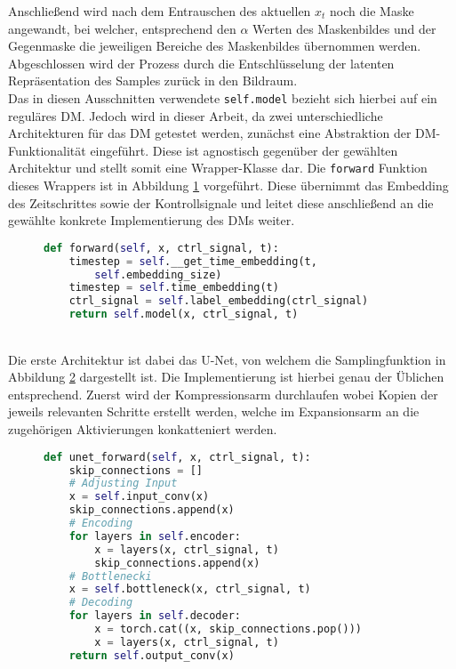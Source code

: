 Anschließend wird nach dem Entrauschen des aktuellen $x_t$ noch die Maske angewandt, bei welcher, entsprechend den $\alpha$ Werten des Maskenbildes und der Gegenmaske die jeweiligen Bereiche des Maskenbildes übernommen werden. \\
Abgeschlossen wird der Prozess durch die Entschlüsselung der latenten Repräsentation des Samples zurück in den Bildraum. \\
Das in diesen Ausschnitten verwendete \texttt{self.model} bezieht sich hierbei auf ein reguläres \ac{DM}. Jedoch wird in dieser Arbeit, da zwei unterschiedliche Architekturen für das DM getestet werden, zunächst eine Abstraktion der DM-Funktionalität eingeführt. Diese ist agnostisch gegenüber der gewählten Architektur und stellt somit eine Wrapper-Klasse dar. Die \texttt{forward} Funktion dieses Wrappers ist in Abbildung \ref{fig:DM_forward} vorgeführt. Diese übernimmt das Embedding des Zeitschrittes sowie der Kontrollsignale und leitet diese anschließend an die gewählte konkrete Implementierung des \ac{DM}s weiter. 
\begin{figure}[htbp]
\begin{lstlisting}[language=python]
def forward(self, x, ctrl_signal, t):
    timestep = self.__get_time_embedding(t, 
        self.embedding_size)
    timestep = self.time_embedding(t)
    ctrl_signal = self.label_embedding(ctrl_signal)
    return self.model(x, ctrl_signal, t)
\end{lstlisting}
    \captionsetup{type=figure}
    \label{fig:DM_forward}
\end{figure} \\
Die erste Architektur ist dabei das U-Net, von welchem die Samplingfunktion in Abbildung \ref{fig:UNET_forward} dargestellt ist. Die Implementierung ist hierbei genau der Üblichen entsprechend. Zuerst wird der Kompressionsarm durchlaufen wobei Kopien der jeweils relevanten Schritte erstellt werden, welche im Expansionsarm an die zugehörigen Aktivierungen konkatteniert werden.  
\begin{figure}[htbp]
\begin{lstlisting}[language=python]
def unet_forward(self, x, ctrl_signal, t):
    skip_connections = []
    # Adjusting Input
    x = self.input_conv(x)
    skip_connections.append(x)
    # Encoding
    for layers in self.encoder:
        x = layers(x, ctrl_signal, t)
        skip_connections.append(x)
    # Bottlenecki
    x = self.bottleneck(x, ctrl_signal, t)
    # Decoding
    for layers in self.decoder:
        x = torch.cat((x, skip_connections.pop())) 
        x = layers(x, ctrl_signal, t)
    return self.output_conv(x)
\end{lstlisting}
    \captionsetup{type=figure}
    \label{fig:UNET_forward}
\end{figure} \\
